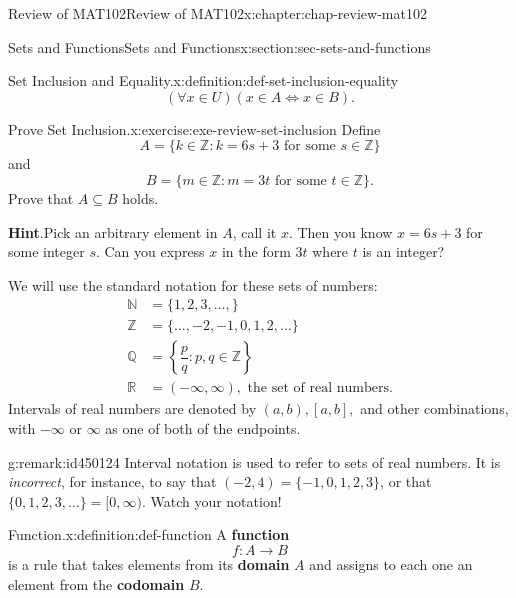 \documentclass[oneside,10pt,]{book}
\newcommand{\blocktitlefont}{\relax}
\newcommand{\terminology}[1]{\textbf{#1}}
\numberwithin{equation}{section}
\newcommand{\amp}{&}
\begin{document}
\begin{chapterptx}{Review of MAT102}{}{Review of MAT102}{}{}{x:chapter:chap-review-mat102}
\begin{sectionptx}{Sets and Functions}{}{Sets and Functions}{}{}{x:section:sec-sets-and-functions}
\begin{definition}{Set Inclusion and Equality.}{x:definition:def-set-inclusion-equality}
\begin{equation*}
(\forall x \in U)(x \in A \Leftrightarrow x \in B)\text{.}
\end{equation*}
%
\end{definition}
\begin{inlineexercise}{Prove Set Inclusion.}{x:exercise:exe-review-set-inclusion}%
Define%
\begin{equation*}
A = \{k \in \mathbb{Z} : k = 6s + 3 \text{ for some } s \in \mathbb{Z}\}
\end{equation*}
and%
\begin{equation*}
B = \{m \in \mathbb{Z} : m = 3t \text{ for some } t \in \mathbb{Z}\}\text{.}
\end{equation*}
Prove that \(A \subseteq B\) holds.%
\par\smallskip%
\noindent\textbf{\blocktitlefont Hint}.\hypertarget{g:hint:id424157}{}\quad{}Pick an arbitrary element in \(A\), call it \(x\). Then you know \(x = 6s + 3\) for some integer \(s\). Can you express \(x\) in the form \(3t\) where \(t\) is an integer?%
\end{inlineexercise}
We will use the standard notation for these sets of numbers: \label{g:notation:id450080}\label{g:notation:id450066}\label{g:notation:id450081}\label{g:notation:id450111}\label{g:notation:id450094}%
\begin{align*}
\mathbb{N} \amp = \{1,2,3,\ldots,\}\\
\mathbb{Z} \amp = \{\ldots,-2,-1,0,1,2,\ldots\}\\
\mathbb{Q} \amp = \left\{\dfrac{p}{q} : p,q \in \mathbb{Z}\right\}\\
\mathbb{R} \amp = (-\infty,\infty), \text{ the set of real numbers.}
\end{align*}
Intervals of real numbers are denoted by \((a,b), [a,b],\) and other combinations, with \(-\infty\) or \(\infty\) as one of both of the endpoints.%
\begin{remark}{}{g:remark:id450124}%
Interval notation is used to refer to sets of real numbers. It is \emph{incorrect}, for instance, to say that \((-2,4) = \{-1,0,1,2,3\}\), or that \(\{0,1,2,3,\ldots\} = [0,\infty)\). Watch your notation!%
\end{remark}
\begin{definition}{Function.}{x:definition:def-function}%
\label{g:notation:id450142} A \terminology{function}%
\begin{equation*}
f: A \rightarrow B
\end{equation*}
is a rule that takes elements from its \terminology{domain} \(A\) and assigns to each one an element from the \terminology{codomain} \(B\).%

\end{definition}
\end{sectionptx}
\end{chapterptx}
\end{document}
